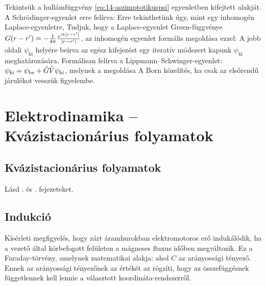    Tekintsük a hullámfüggvény \eqref{eq:14-aszimptotikuspsi} egyenletben kifejtett alakját. A Schrödinger-egyenlet erre felírva:
   Erre tekinthetünk úgy, mint egy inhomogén Laplace-egyenletre, Tudjuk, hogy a Laplace-egyenlet Green-függvénye $G(r-r')=-\frac{1}{4\pi}\frac{e^{ik\left\lvert r-r'\right\rvert}}{\left\lvert r-r'\right\rvert}$, az inhomogén egyenlet formális megoldása ezzel:
   A jobb oldali $\psi_\text{ki}$ helyére beírva az egész kifejezést egy iteratív módszert kapunk $\psi_\text{ki}$ meghatározására. Formálisan felírva a Lippmann--Schwinger-egyenlet: $\psi_\text{ki}=\psi_\text{be}+\hat{G}\hat{V}\psi_\text{ki}$, melynek a megoldása
   A Born közelítés, ha csak az elsőrendű járulékot vesszük figyelembe. 
   
 \section{Elektrodinamika -- Kvázistacionárius folyamatok}
  
  \subsection{Kvázistacionárius folyamatok}
   
   Lásd . és . fejezeteket.
   
  \subsection{Indukció}
  
  Kísérleti megfigyelés, hogy zárt áramhurokban elektromotoros erő indukálódik, ha a vezető által körbefogott felületen a mágneses fluxus időben megváltozik. Ez a Faraday-törvény, amelynek matematikai alakja:
  ahol $C$ az arányossági tényező. Ennek az arányossági tényezőnek az értékét az rögzíti, hogy az összefüggésnek függetlennek kell lennie a választott koordináta-rendszerről. 
  
